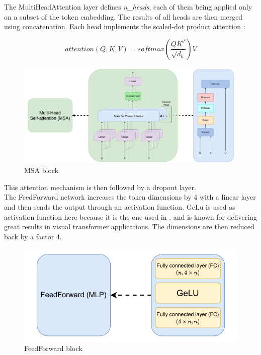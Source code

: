 \documentclass[twocolumn,superscriptaddress,aps]{revtex4-1}
\begin{document}
The MultiHeadAttention layer defines \textit{n\_heads}, each of them being applied only on a subset of the token embedding. The results of all heads are then merged using concatenation. Each head implements the scaled-dot product attention :

$$
attention(Q,K,V) = softmax \left( \frac{Q K^{T}}{\sqrt{d_k}} \right) V
$$

\begin{figure}[H]
    \begin{flushleft}
        
    \includegraphics[width=0.9\linewidth]{images/msa_block (1).pdf}
    \caption{MSA block}
    \label{fig:enter-label}
    \end{flushleft}
\end{figure}

This attention mechanism is then followed by a dropout layer. \\

The FeedForward network increases the token dimensions by 4 with a linear layer and then sends the output through an activation function. GeLu is used as activation function here because it is the one used in \cite{vit}, and is known for delivering great results in visual transformer applications. The dimensions are then reduced back by a factor 4. \\

\begin{figure}[H]
    \centering
    \includegraphics[width=0.75\linewidth]{images/ff_block.pdf}
    \caption{FeedForward block}
    \label{fig:ff_block}
\end{figure}
\end{document}
